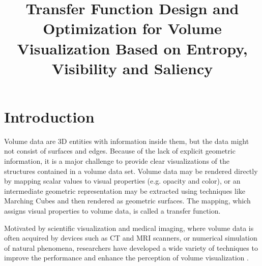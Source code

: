 \documentclass{egpubl}
\title%
{
Transfer Function Design and Optimization for Volume Visualization Based on Entropy, Visibility and Saliency}
\begin{document}
	
	
\maketitle

%	
%	

\section{Introduction}
Volume data are 3D entities with information inside them, but the data might not consist of surfaces and edges.
Because of the lack of explicit geometric information, %
it is a major challenge to provide clear visualizations of the structures contained in a volume data set.
Volume data may be rendered directly by mapping scalar values to visual properties (e.g. opacity and color), or an intermediate geometric representation may be extracted using techniques like Marching Cubes \cite{lorensen_marching_1987} and then rendered as geometric surfaces. The mapping, which assigns visual properties to volume data, is called a transfer function.

Motivated by scientific visualization and medical imaging, where volume data is often acquired by devices such as CT and MRI scanners, or numerical simulation of natural phenomena, researchers have developed a wide variety of techniques to improve the performance and enhance the perception of volume visualization \cite{corcoran_enhancing_2013}.
\end{document}
